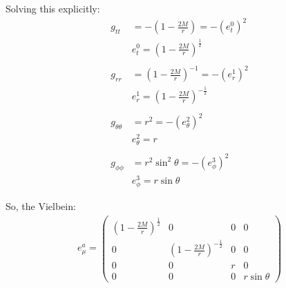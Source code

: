 \documentclass[12pt]{article}
\begin{document}
Solving this explicitly:
\begin{align*}
  g_{tt} &= -\left(1 - \frac{2M}{r}\right) = -(e^0_t)^2 \\
  &e^0_t = \left(1 - \frac{2M}{r}\right)^\frac{1}{2} \\ \\
  g_{rr} &= \left(1 - \frac{2M}{r}\right)^{-1} = -(e^1_r)^2 \\
  &e^1_r = \left(1 - \frac{2M}{r}\right)^{-\frac{1}{2}} \\ \\
  g_{\theta\theta} &= r^2 = -(e^2_\theta)^2 \\
  &e^2_\theta = r \\ \\
  g_{\phi\phi} &= r^2\sin^2{\theta} = -(e^3_\phi)^2 \\
  &e^3_\phi = r\sin{\theta}
\end{align*}

So, the Vielbein:
\begin{align*}
  e^a_\mu = 
  \begin{pmatrix}
    \left(1 - \frac{2M}{r}\right)^\frac{1}{2} & 0 & 0 & 0 \\
    0 & \left(1 - \frac{2M}{r}\right)^{-\frac{1}{2}} & 0 & 0 \\
    0 & 0 & r & 0 \\
    0 & 0 & 0 & r\sin{\theta}
  \end{pmatrix}
\end{align*}
\end{document}

